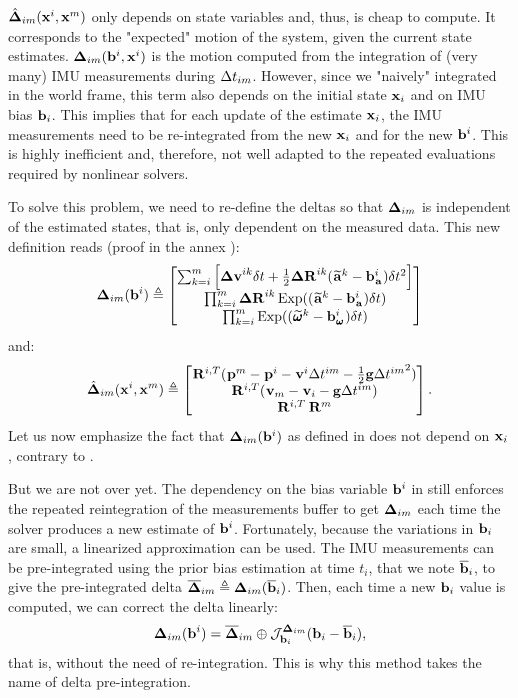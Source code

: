 $\hat{{{\bm \Delta}}}_{im}({\bf x}^i, {\bf x}^m)$ only depends on state variables and, thus, is cheap to compute. It corresponds to the "expected" motion of the system, given the current state estimates. 
${{\bm \Delta}}_{im}({\bf b}^i, {\bf x}^i)$ is the motion computed from the integration of (very many) IMU measurements during $\Delta t_{im}$. However, since we "naively" integrated
in the world frame, this term also depends on the initial state ${\bf x}_i$ and on IMU bias ${\bf b}_i$. This implies that for each update of the estimate ${\bf x}_i$, the IMU measurements need to be re-integrated from the new ${\bf x}_i$ and for the new ${\bf b}^i$. This is highly inefficient and, therefore, not well adapted to the repeated evaluations required by nonlinear solvers.

To solve this problem, we need to re-define the deltas so that ${{\bm \Delta}}_{im}$ is independent of the estimated states, that is, only dependent on the measured data. This new definition reads \cite{lupton-09, forster2015imu} (proof in the annex ):
%
\begin{align}
    {{\bm \Delta}}_{im}({\bf b}^i) \triangleq 
    \begin{bmatrix}
    \sum_{k=i}^{m} \Big[{\bm \Delta {\bf v}}^{ik}\delta t +  \frac{1}{2} {\bm \Delta {\bf R}}^{ik} (\prescript{}{}{\widetilde{{\bf a}}}_{}^k - {\bf b}_{\prescript{}{}{{\bf a}}_{}}^i)\delta t^2 \Big] \\
    \prod_{k=i}^{m} {\bm \Delta {\bf R}}^{ik} \operatorname*{Exp}((\prescript{}{}{\widetilde{{\bf a}}}_{}^k - {\bf b}_{\prescript{}{}{{\bf a}}_{}}^i)\delta t)  \\
    \prod_{k=i}^{m} \operatorname*{Exp}((\prescript{}{}{\widetilde{\pmb{\omega}}}_{}^k - {\bf b}_{\prescript{}{}{\pmb{\omega}}_{}}^i)\delta t)  
    \end{bmatrix}
    \label{eq:imu_delta}
\end{align}
%
and:
%
\begin{align}
    \hat{{{\bm \Delta}}}_{im}({\bf x}^i, {\bf x}^m) \triangleq 
    \begin{bmatrix}
    \prescript{}{}{{\bf R}}_{}^{i,T}(\prescript{}{}{{\bf p}}_{}^m - \prescript{}{}{{\bf p}}_{}^i - \prescript{}{}{{\bf v}}_{}^i \Delta t^{im} - \frac{1}{2} {\bf g} {\Delta t^{im}}^2) \\
    \prescript{}{}{{\bf R}}_{}^{i,T} (\prescript{}{}{{\bf v}}_{m} - \prescript{}{}{{\bf v}}_{i} - {\bf g} \Delta t^{im})  \\
    \prescript{}{}{{\bf R}}_{}^{i,T} \prescript{}{}{{\bf R}}_{}^{m}  
    \end{bmatrix}.
\end{align}
%
Let us now emphasize the fact that ${{\bm \Delta}}_{im}({\bf b}^i)$ as defined in  does not depend on ${\bf x}_i$, contrary to . 

But we are not over yet. The dependency on the bias variable ${\bf b}^i$ in  still enforces the repeated reintegration of the measurements buffer to get ${{\bm \Delta}}_{im}$ each time the solver produces a new estimate of ${\bf b}^i$. 
Fortunately, because the variations in ${\bf b}_i$ are small, a linearized approximation can be used. The IMU measurements can be pre-integrated using the prior bias estimation at time $t_i$, that we note $\overline{{\bf b}}_i$, to give the pre-integrated delta $\overline{{{\bm \Delta}}}_{im}\triangleq{{\bm \Delta}}_{im}(\overline{{\bf b}}_i)$.
Then, each time a new ${\bf b}_i$ value is computed, we can correct the delta linearly:
%
\begin{align}
    {{\bm \Delta}}_{im}({\bf b}^i) = \overline{{{\bm \Delta}}}_{im} \oplus {\mathcal{J}^{{{\bm \Delta}}_{im}}_{{\bf b}_i}}({\bf b}_i-\overline{{\bf b}}_i),
\end{align}
%
that is, without the need of re-integration. This is why this method takes the name of delta pre-integration.


